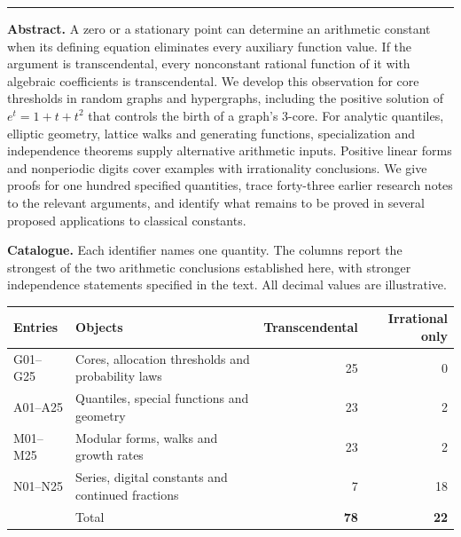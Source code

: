 \documentclass[11pt,a4paper]{article}
\theoremstyle{definition}
\theoremstyle{remark}
\begin{document}
\thispagestyle{plain}
\par
\vspace{1.3em}
\vspace{.55em}
\par
\vspace{1.0em}
\noindent\rule{\textwidth}{0.5pt}\par
\vspace{.6em}
\noindent\textbf{Abstract.}
A zero or a stationary point can determine an arithmetic constant when its defining equation eliminates every auxiliary function value. If the argument is transcendental, every nonconstant rational function of it with algebraic coefficients is transcendental. We develop this observation for core thresholds in random graphs and hypergraphs, including the positive solution of $e^t=1+t+t^2$ that controls the birth of a graph's $3$-core. For analytic quantiles, elliptic geometry, lattice walks and generating functions, specialization and independence theorems supply alternative arithmetic inputs. Positive linear forms and nonperiodic digits cover examples with irrationality conclusions. We give proofs for one hundred specified quantities, trace forty-three earlier research notes to the relevant arguments, and identify what remains to be proved in several proposed applications to classical constants.
\par\vspace{1em}
\noindent\textbf{Catalogue.} Each identifier names one quantity. The columns report the strongest of the two arithmetic conclusions established here, with stronger independence statements specified in the text. All decimal values are illustrative.
\begin{center}\small
\begin{tabularx}{\linewidth}{@{}lXrr@{}}\toprule
Entries & Objects & Transcendental & Irrational only\\\midrule
G01--G25 & Cores, allocation thresholds and probability laws & 25&0\\
A01--A25 & Quantiles, special functions and geometry & 23&2\\
M01--M25 & Modular forms, walks and growth rates & 23&2\\
N01--N25 & Series, digital constants and continued fractions & 7&18\\\midrule
& Total & \textbf{78}&\textbf{22}\\\bottomrule
\end{tabularx}
\end{center}
\end{document}
